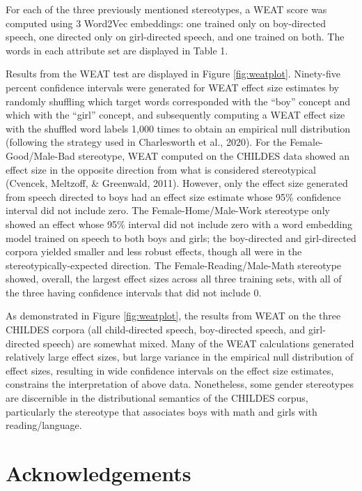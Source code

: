 \documentclass[10pt, letterpaper]{article}
\begin{document}
For each of the three previously mentioned stereotypes, a WEAT score was
computed using 3 Word2Vec embeddings: one trained only on boy-directed
speech, one directed only on girl-directed speech, and one trained on
both. The words in each attribute set are displayed in Table 1.

Results from the WEAT test are displayed in Figure \ref{fig:weatplot}.
Ninety-five percent confidence intervals were generated for WEAT effect
size estimates by randomly shuffling which target words corresponded
with the ``boy'' concept and which with the ``girl'' concept, and
subsequently computing a WEAT effect size with the shuffled word labels
1,000 times to obtain an empirical null distribution (following the
strategy used in Charlesworth et al., 2020). For the
Female-Good/Male-Bad stereotype, WEAT computed on the CHILDES data
showed an effect size in the opposite direction from what is considered
stereotypical (Cvencek, Meltzoff, \& Greenwald, 2011). However, only the
effect size generated from speech directed to boys had an effect size
estimate whose 95\% confidence interval did not include zero. The
Female-Home/Male-Work stereotype only showed an effect whose 95\%
interval did not include zero with a word embedding model trained on
speech to both boys and girls; the boy-directed and girl-directed
corpora yielded smaller and less robust effects, though all were in the
stereotypically-expected direction. The Female-Reading/Male-Math
stereotype showed, overall, the largest effect sizes across all three
training sets, with all of the three having confidence intervals that
did not include 0.

As demonstrated in Figure \ref{fig:weatplot}, the results from WEAT on
the three CHILDES corpora (all child-directed speech, boy-directed
speech, and girl-directed speech) are somewhat mixed. Many of the WEAT
calculations generated relatively large effect sizes, but large variance
in the empirical null distribution of effect sizes, resulting in wide
confidence intervals on the effect size estimates, constrains the
interpretation of above data. Nonetheless, some gender stereotypes are
discernible in the distributional semantics of the CHILDES corpus,
particularly the stereotype that associates boys with math and girls
with reading/language.

\hypertarget{acknowledgements}{%
\section{Acknowledgements}\label{acknowledgements}}
\end{document}
